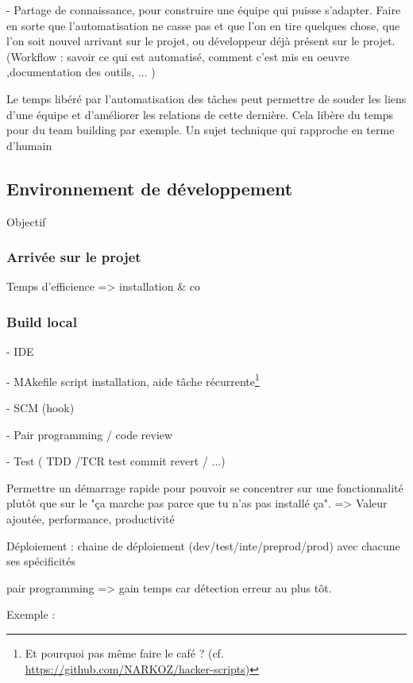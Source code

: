 - Partage de connaissance, pour construire une équipe qui puisse s'adapter. Faire en sorte que l'automatisation ne casse pas et que l'on en tire quelques chose, que l'on soit nouvel arrivant sur le projet, ou développeur déjà présent sur le projet. (Workflow : savoir ce qui est automatisé, comment c'est mis en oeuvre ,documentation des outils, ... )

Le temps libéré par l'automatisation des tâches peut permettre de souder les liens d'une équipe et d'améliorer les relations de cette dernière. Cela libère du temps pour du team building par exemple. Un sujet technique qui rapproche en terme d'humain

\subsection{Environnement de développement}

Objectif

\subsubsection{Arrivée sur le projet}

Temps d'efficience => installation \& co

\subsubsection{Build local}

- IDE

- MAkefile script installation, aide tâche récurrente\footnote{Et pourquoi pas même faire le café ? (cf. \url{https://github.com/NARKOZ/hacker-scripts})}

- SCM (hook)

- Pair programming / code review

- Test ( TDD /TCR test commit revert / ...)


Permettre un démarrage rapide pour pouvoir se concentrer sur une fonctionnalité plutôt que sur le "ça marche pas parce que tu n’as pas installé ça". => Valeur ajoutée, performance, productivité

Déploiement : chaine de déploiement (dev/test/inte/preprod/prod) avec chacune ses spécificités

pair programming => gain temps car détection erreur au plus tôt.

Exemple :


